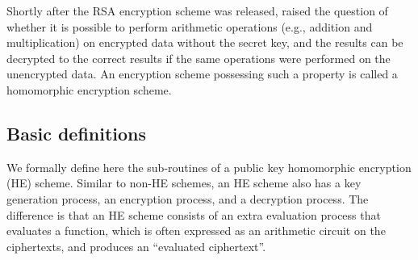 \documentclass[../main.tex]{subfiles}
\begin{document}
\label{sec:he}


Shortly after the RSA encryption scheme \cite{rivest1978method} was released, \cite{rivest1978data} raised the question of whether it is possible to perform arithmetic operations (e.g., addition and multiplication) on encrypted data without the secret key, and the results can be decrypted to the correct results if the same operations were performed on the unencrypted data. An encryption scheme possessing such a property is called a homomorphic encryption scheme. 

\subsection{Basic definitions}

We formally define here the sub-routines of a public key homomorphic encryption (HE) scheme. Similar to non-HE schemes, an HE scheme also has a key generation process, an encryption process, and a decryption process. The difference is that an HE scheme consists of an extra evaluation process that evaluates a function, which is often expressed as an arithmetic circuit on the ciphertexts, and produces an ``evaluated ciphertext''. %
\end{document}
